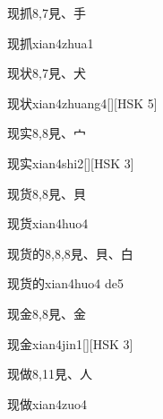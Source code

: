 \begin{entry}{现抓}{8,7}{⾒、⼿}
  \begin{phonetics}{现抓}{xian4zhua1}
  \end{phonetics}
\end{entry}

\begin{entry}{现状}{8,7}{⾒、⽝}
  \begin{phonetics}{现状}{xian4zhuang4}[][HSK 5]
  \end{phonetics}
\end{entry}

\begin{entry}{现实}{8,8}{⾒、⼧}
  \begin{phonetics}{现实}{xian4shi2}[][HSK 3]
  \end{phonetics}
\end{entry}

\begin{entry}{现货}{8,8}{⾒、⾙}
  \begin{phonetics}{现货}{xian4huo4}
  \end{phonetics}
\end{entry}

\begin{entry}{现货的}{8,8,8}{⾒、⾙、⽩}
  \begin{phonetics}{现货的}{xian4huo4 de5}
  \end{phonetics}
\end{entry}

\begin{entry}{现金}{8,8}{⾒、⾦}
  \begin{phonetics}{现金}{xian4jin1}[][HSK 3]
  \end{phonetics}
\end{entry}

\begin{entry}{现做}{8,11}{⾒、⼈}
  \begin{phonetics}{现做}{xian4zuo4}
  \end{phonetics}
\end{entry}

